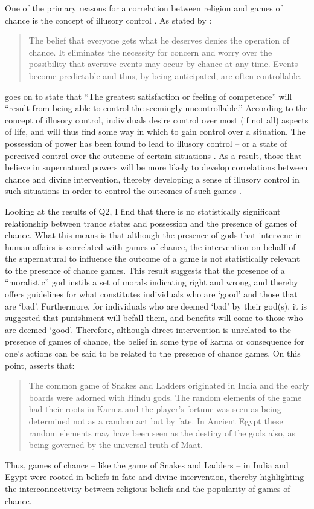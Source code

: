 \documentclass[%
	]{ijsra}
\begin{document}
One of the primary reasons for a correlation between religion and games of chance is the concept of illusory control \parencites[see][]{wohl2002}{langer1975}. As stated by \textcite[312]{langer1975}: 
\begin{quote}
The belief that everyone gets what he deserves denies the operation of chance. It eliminates the necessity for concern and worry over the possibility that aversive events may occur by chance at any time. Events become predictable and thus, by being anticipated, are often controllable.
\end{quote}
\textcite[323]{langer1975} goes on to state that ``The greatest satisfaction or feeling of competence” will ``result from being able to control the seemingly uncontrollable.” According to the concept of illusory control, individuals desire control over most (if not all) aspects of life, and will thus find some way in which to gain control over a situation. The possession of power has been found to lead to illusory control – or a state of perceived control over the outcome of certain situations \parencite{fast2009}. As a result, those that believe in supernatural powers will be more likely to develop correlations between chance and divine intervention, thereby developing a sense of illusory control in such situations in order to control the outcomes of such games \parencite[1089]{tobacyk1991}.

Looking at the results of Q2, I find that there is no statistically significant relationship between trance states and possession and the presence of games of chance. What this means is that although the presence of gods that intervene in human affairs is correlated with games of chance, the intervention on behalf of the supernatural to influence the outcome of a game is not statistically relevant to the presence of chance games. This result suggests that the presence of a ``moralistic” god instils a set of morals indicating right and wrong, and thereby offers guidelines for what constitutes individuals who are ‘good’ and those that are ‘bad’. Furthermore, for individuals who are deemed ‘bad’ by their god(s), it is suggested that punishment will befall them, and benefits will come to those who are deemed ‘good’. Therefore, although direct intervention is unrelated to the presence of games of chance, the belief in some type of karma or consequence for one’s actions can be said to be related to the presence of chance games. On this point, \textcite{robinson2015} asserts that:
\begin{quote}
The common game of Snakes and Ladders originated in India and the early boards were adorned with Hindu gods. The random elements of the game had their roots in Karma and the player's fortune was seen as being determined not as a random act but by fate. In Ancient Egypt these random elements may have been seen as the destiny of the gods also, as being governed by the universal truth of Maat.
\end{quote}
Thus, games of chance – like the game of Snakes and Ladders – in India and Egypt were rooted in beliefs in fate and divine intervention, thereby highlighting the interconnectivity between religious beliefs and the popularity of games of chance.
\end{document}
